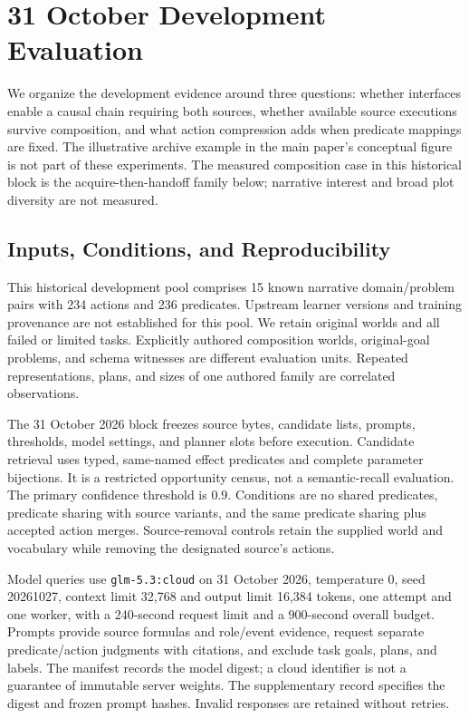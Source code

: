 \section{31 October Development Evaluation}
We organize the development evidence around three questions: whether interfaces enable a causal chain requiring both sources, whether available source executions survive composition, and what action compression adds when predicate mappings are fixed. The illustrative archive example in the main paper's conceptual figure is not part of these experiments. The measured composition case in this historical block is the acquire-then-handoff family below; narrative interest and broad plot diversity are not measured.

\subsection{Inputs, Conditions, and Reproducibility}
This historical development pool comprises 15 known narrative domain/problem pairs with 234 actions and 236 predicates. Upstream learner versions and training provenance are not established for this pool. We retain original worlds and all failed or limited tasks. Explicitly authored composition worlds, original-goal problems, and schema witnesses are different evaluation units. Repeated representations, plans, and sizes of one authored family are correlated observations.

The 31 October 2026 block freezes source bytes, candidate lists, prompts, thresholds, model settings, and planner slots before execution. Candidate retrieval uses typed, same-named effect predicates and complete parameter bijections. It is a restricted opportunity census, not a semantic-recall evaluation. The primary confidence threshold is 0.9. Conditions are no shared predicates, predicate sharing with source variants, and the same predicate sharing plus accepted action merges. Source-removal controls retain the supplied world and vocabulary while removing the designated source's actions.

Model queries use \texttt{glm-5.3:cloud} on 31 October 2026, temperature 0, seed 20261027, context limit 32,768 and output limit 16,384 tokens, one attempt and one worker, with a 240-second request limit and a 900-second overall budget. Prompts provide source formulas and role/event evidence, request separate predicate/action judgments with citations, and exclude task goals, plans, and labels. The manifest records the model digest; a cloud identifier is not a guarantee of immutable server weights. The supplementary record specifies the digest and frozen prompt hashes. Invalid responses are retained without retries.

